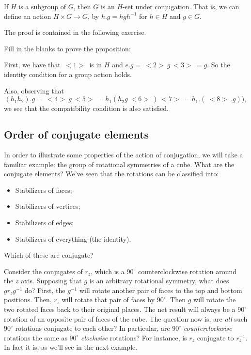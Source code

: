 \begin{prop}\label{proposition:actions:HSetCojugation} If $H$ is a subgroup of $G$, then $G$ is an $H$-set under conjugation.  That is, we can define an action $H \times G\rightarrow G$, by $h.g=hgh^{-1}$ for $h\in H$ and $g\in G$. 
\end{prop}
The proof is contained in the following exercise.

\begin{exercise}\label{exercise:actions:Conj8}
Fill in the blanks to prove the proposition:

\noindent
First, we have that $\underline{~<1>~}$ is in  $H$ and $e.g=\underline{~<2>~}g\underline{~<3>~} = g$.
So the identity condition for a group action holds. 

Also, observing that
\[(h_1h_2).g =\underline{~<4>~}g\underline{~<5>~}
= h_1(h_2g\underline{~<6>~} )\underline{~<7>~}
= h_1. (\underline{~<8>~}. g)),\]
we see that the compatibility condition is also satisfied.
\end{exercise}

\subsection{Order of conjugate elements}

In order to illustrate some properties of the action of conjugation, we will take a familiar example: the group of rotational symmetries of a cube.
What are the conjugate elements?
We've seen that the rotations can be classified into:
\begin{itemize}
\item
Stabilizers of faces;
\item
Stabilizers of vertices;
\item
Stabilizers of edges;
\item
Stabilizers of everything (the identity).
\end{itemize}
Which of these are conjugate? 


Consider the conjugates of $r_z$, which is a  $90^{\circ}$ counterclockwise rotation around the $z$ axis. Supposing that $g$ is an arbitrary rotational symmetry, what does $g r_z g^{-1}$ do? First, the $g^{-1}$ will rotate another pair of faces to the top and bottom positions. Then, $r_z$ will rotate that pair of faces by  $90^{\circ}$. Then $g$ will rotate the two rotated faces back to their original places. The net result will always be a  $90^{\circ}$ rotation of an opposite pair of faces of the cube. 
The question now is, are \emph{all} such  $90^{\circ}$ rotations conjugate to each other? In particular, are  $90^{\circ}$ \emph{counterclockwise} rotations the same as  $90^{\circ}$ \emph{clockwise} rotations? For instance, is $r_z$ conjugate to $r_z^{-1}$.  In fact it is, as we'll see in the next example.

